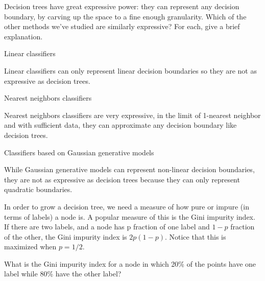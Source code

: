 \documentclass{article}
\begin{document}
\begin{probset}
\newpage

\begin{prob}
    Decision trees have great expressive power: they can represent any decision boundary, by carving up the space to a fine enough granularity. Which of the other methods we've studied are similarly expressive? For each, give a brief explanation.

    \begin{subprobset}
    \begin{subprob}
        Linear classifiers

        \begin{soln}
            Linear classifiers can only represent linear decision boundaries so they are not as expressive as decision trees.
        \end{soln}
    \end{subprob}

    \begin{subprob}
        Nearest neighbors classifiers

        \begin{soln}
            Nearest neighbors classifiers are very expressive, in the limit of 1-nearest neighbor and with sufficient data, they can approximate any decision boundary like decision trees.
        \end{soln}
    \end{subprob}

    \begin{subprob}
        Classifiers based on Gaussian generative models

        \begin{soln}
            While Gaussian generative models can represent non-linear decision boundaries, they are not as expressive as decision trees because they can only represent quadratic boundaries.
        \end{soln}
    \end{subprob}
    \end{subprobset}
\end{prob}

\begin{prob}
    In order to grow a decision tree, we need a measure of how pure or impure (in terms of labels) a node is. A popular measure of this is the Gini impurity index. If there are two labels, and a node has p fraction of one label and $1 - p$ fraction of the other, the Gini impurity index is $2p(1 - p)$. Notice that this is maximized when $p = 1/2$.

    What is the Gini impurity index for a node in which 20\% of the points have one label while 80\% have the other label?


\end{prob}
\end{probset}
\end{document}
